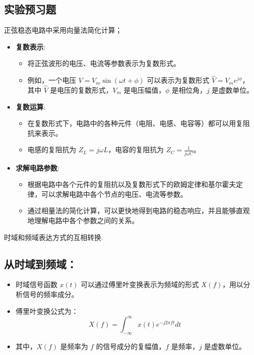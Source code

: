 \documentclass[dvipsnames, svgnames,a4paper,11pt]{article}
\begin{document}
	\subsection{实验预习题}
	
	\begin{question}
		正弦稳态电路中采用向量法简化计算；
	\end{question}
	\begin{itemize}
		\item \textbf{复数表示}:
		  \begin{itemize}
			\item 将正弦波形的电压、电流等参数表示为复数形式。
			\item 例如，一个电压 $V = V_m \sin(\omega t + \phi)$ 可以表示为复数形式 $\hat{V} = V_m e^{j\phi}$，其中 $\hat{V}$ 是电压的复数形式，$V_m$ 是电压幅值，$\phi$ 是相位角，$j$ 是虚数单位。
		  \end{itemize}
		  
		\item \textbf{复数运算}:
		  \begin{itemize}
			\item 在复数形式下，电路中的各种元件（电阻、电感、电容等）都可以用复阻抗来表示。
			\item 电感的复阻抗为 $Z_L = j\omega L$，电容的复阻抗为 $Z_C = \frac{1}{j\omega C}$。
		  \end{itemize}
		  
		\item \textbf{求解电路参数}:
		  \begin{itemize}
			\item 根据电路中各个元件的复阻抗以及复数形式下的欧姆定律和基尔霍夫定律，可以求解电路中各个节点的电压、电流等参数。
			\item 通过相量法的简化计算，可以更快地得到电路的稳态响应，并且能够直观地理解电路中各个参数之间的关系。
		  \end{itemize}
	  \end{itemize}
	\begin{question}
		时域和频域表达方式的互相转换.
	\end{question}
	\subsection*{从时域到频域：}
\begin{itemize}
  \item 时域信号函数 $x(t)$ 可以通过傅里叶变换表示为频域的形式 $X(f)$，用以分析信号的频率成分。
  \item 傅里叶变换公式为：
    \[
    X(f) = \int_{-\infty}^{\infty} x(t)e^{-j2\pi ft} dt
    \]
  \item 其中，$X(f)$ 是频率为 $f$ 的信号成分的复幅值，$f$ 是频率，$j$ 是虚数单位。
\end{itemize}
\end{document}
